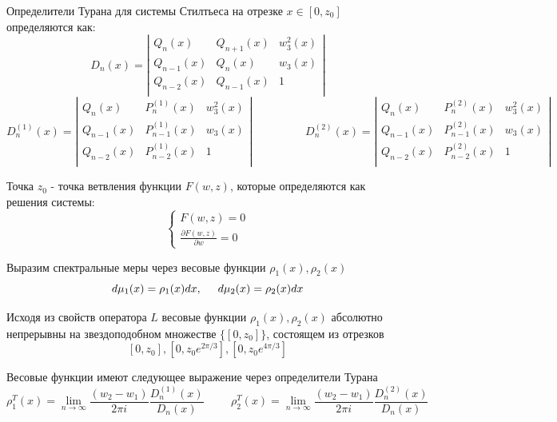 \documentclass[12pt, a4paper]{report}
\begin{document}
Определители Турана для системы Стилтьеса на отрезке $x\in [0,z_0]$ определяются как: 
$$
D_n(x)=\left| \begin{array}{ccccccc}
Q_n(x) & Q_{n+1}(x) & w_3^2(x)\\
Q_{n-1}(x) & Q_{n}(x) & w_3(x)\\
Q_{n-2}(x) & Q_{n-1}(x) & 1\\
\end{array}
\right|
$$
$$
D^{(1)}_n(x)=\left| \begin{array}{ccccccc}
Q_n(x) & P^{(1)}_{n}(x) & w_3^2(x)\\
Q_{n-1}(x) & P^{(1)}_{n-1}(x) & w_3(x)\\
Q_{n-2}(x) & P^{(1)}_{n-2}(x) & 1\\
\end{array}
\right| \hspace{2cm}
D^{(2)}_n(x)=\left| \begin{array}{ccccccc}
Q_n(x) & P^{(2)}_{n}(x) & w_3^2(x)\\
Q_{n-1}(x) & P^{(2)}_{n-1}(x) & w_3(x)\\
Q_{n-2}(x) & P^{(2)}_{n-2}(x) & 1\\
\end{array}
\right|
$$

Точка $z_0$ - точка ветвления функции $F(w,z)$, которые определяются как решения системы:
\begin{equation}
\left\{
\begin{array}{lllll}
F(w,z)=0 \\
\displaystyle \frac{\partial F(w,z)}{\partial w} = 0
\end{array}
\right.
\end{equation}  

Выразим спектральные меры через весовые функции $\rho_1(x), \rho_2(x)$
$$
d\mu_1(x)=\rho_1(x)dx, \hspace{0.5 cm} d\mu_2(x)=\rho_2(x)dx
$$

Исходя из свойств оператора $L$ весовые функции $\rho_1(x), \rho_2(x)$ абсолютно непрерывны на звездоподобном множестве $\{[0,z_0]\}$, состоящем из отрезков
$$
[0,z_0], [0,z_0 e^{2\pi/3}], [0,z_0 e^{4\pi/3}]
$$

Весовые функции имеют следующее выражение через определители Турана 
\begin{equation}
\rho_1^T(x)= \lim_{n\rightarrow \infty} \displaystyle \frac {(w_2-w_1)}{2\pi i} \frac{D^{(1)}_n(x)}{D_n(x)} \hspace{1cm}
\rho_2^T(x)= \lim_{n\rightarrow \infty} \displaystyle \frac {(w_2-w_1)}{2\pi i} \frac{D^{(2)}_n(x)}{D_n(x)} 
\end{equation}
\end{document}
